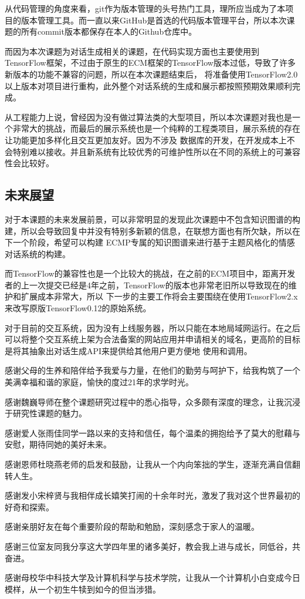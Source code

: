 \documentclass[supercite]{HustGraduPaper}
\theoremstyle{definition}
\begin{document}
从代码管理的角度来看，git作为版本管理的头号热门工具，理所应当成为了本项目的版本管理工具。而一直以来GitHub是首选的代码版本管理平台，所以本次课题的所有commit版本都保存在本人的Github仓库中。

而因为本次课题为对话生成相关的课题，在代码实现方面也主要使用到TensorFlow框架，不过由于原生的ECM框架的TensorFlow版本过低，导致了许多新版本的功能不兼容的问题，所以在本次课题结束后，
将准备使用TensorFlow2.0以上版本对项目进行重构，此外整个对话系统的生成和展示都按照预期效果顺利完成。

从工程能力上说，曾经因为没有做过算法类的大型项目，所以本次课题对我也是一个非常大的挑战，而最后的展示系统也是一个纯粹的工程类项目，展示系统的存在让功能更加多样化且交互更加友好。因为不涉及
数据库的开发，在开发成本上不会特别难以接收。并且新系统有比较优秀的可维护性所以在不同的系统上的可兼容性会比较好。

\subsection{未来展望}
对于本课题的未来发展前景，可以非常明显的发现此次课题中不包含知识图谱的构建，所以会导致回复中并没有特别多新颖的信息，在联想方面也有所欠缺，所以在下一个阶段，希望可以构建
ECMP专属的知识图谱来进行基于主题风格化的情感对话系统的构建。

而TensorFlow的兼容性也是一个比较大的挑战，在之前的ECM项目中，距离开发者的上一次提交已经是4年之前，TensorFlow的版本也非常老旧所以导致现在的维护和扩展成本非常大，所以
下一步的主要工作将会主要围绕在使用TensorFlow2.x来改写原版TensorFlow0.12的原始系统。

对于目前的交互系统，因为没有上线服务器，所以只能在本地局域网运行。在之后可以将整个交互系统上架为合法备案的网站应用并申请相关的域名，更高阶的目标是将其抽象出对话生成API来提供给其他用户更方便地
使用和调用。


\begin{thankpage}
感谢父母的生养和陪伴给予我爱与力量，在他们的勤劳与呵护下，给我构筑了一个美满幸福和谐的家庭，愉快的度过21年的求学时光。

感谢魏巍导师在整个课题研究过程中的悉心指导，众多颇有深度的理念，让我沉浸于研究性课题的魅力。

感谢爱人张雨佳同学一路以来的支持和信任，每个温柔的拥抱给予了莫大的慰藉与安慰，期待同她的美好未来。

感谢恩师杜晓燕老师的启发和鼓励，让我从一个内向笨拙的学生，逐渐充满自信翻转人生。

感谢发小宋梓贤与我相伴成长嬉笑打闹的十余年时光，激发了我对这个世界最初的好奇和探索。

感谢亲朋好友在每个重要阶段的帮助和勉励，深刻感念于家人的温暖。

感谢三位室友同我分享这大学四年里的诸多美好，教会我上进与成长，同低谷，共奋进。

感谢母校华中科技大学及计算机科学与技术学院，让我从一个计算机小白变成今日模样，从一个初生牛犊到如今的但当涉猎。

\end{thankpage}

\nocite{*}


\end{document}
